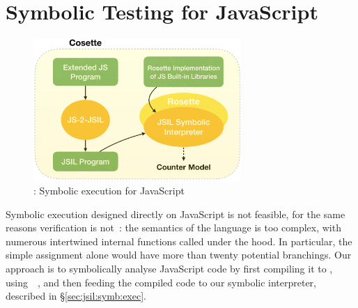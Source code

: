 %
 


\section{Symbolic Testing for JavaScript}
\label{sec:sym:exec:js}

\begin{figure}[t]
\centering
\includegraphics[width=0.7\textwidth]{figures/jilette.png}
\vspace*{-0.2cm}
\caption{\jilette: Symbolic execution for JavaScript}
\vspace*{-0.3cm}
\label{fig:jilette:diagram}
\end{figure}

Symbolic execution designed directly on JavaScript is not feasible, for the same reasons verification is not~\cite{JoseCADE}: the semantics of the language is too complex, with numerous intertwined internal functions called under the hood. In particular, the simple assignment alone would have more than twenty potential branchings. Our approach is to symbolically analyse JavaScript code by first compiling it to \jsil, using~\JSComp~\cite{javert}, and then feeding the compiled \jsil code to our \jsil symbolic interpreter, described in \S\ref{sec:jsil:symb:exec}.

